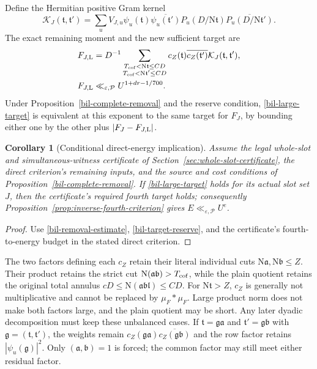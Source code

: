 \documentclass[11pt]{article}
\newtheorem{corollary}[theorem]{Corollary}
\theoremstyle{definition}
\newcommand{\N}{\mathrm N}
\newcommand{\eps}{\varepsilon}
\newcommand{\lls}{\ll_{\eps,\mathcal P}}
\begin{document}
Define the Hermitian positive Gram kernel
\begin{equation}\label{bil-large-kernel}
 \mathcal K_J(\mathfrak t,\mathfrak t')
 =\sum_uV_{J,u}\psi_u(\mathfrak t)
                    \overline{\psi_u(\mathfrak t')}
 P_u(D/\N\mathfrak t)\overline{P_u(D/\N\mathfrak t')}.
\end{equation}
The exact remaining moment and the new sufficient target are
\begin{align}
 F_{J,\rm L}&=D^{-1}
 \sum_{\substack{T_{\rm cof}<\N\mathfrak t\le CD\\T_{\rm cof}<\N\mathfrak t'\le CD}}
 c_Z(\mathfrak t)\overline{c_Z(\mathfrak t')}
                            \mathcal K_J(\mathfrak t,\mathfrak t'),
                                     \label{bil-large-form}\\
 F_{J,\rm L}&\lls U^{1+dr-1/700}.
                                     \label{bil-large-target}
\end{align}
Under Proposition~\ref{bil-complete-removal} and the reserve condition,
\eqref{bil-large-target} is equivalent at this exponent to the same
target for $F_J$, by bounding either one by the other plus
$|F_J-F_{J,\rm L}|$.

\begin{corollary}[Conditional direct-energy implication]
\label{bil-energy-corollary}
Assume the legal whole-slot and simultaneous-witness certificate of
Section~\ref{sec:whole-slot-certificate}, the direct criterion's remaining
inputs, and the source and cost conditions of
Proposition~\ref{bil-complete-removal}.  If
\eqref{bil-large-target} holds for its actual slot set $J$, then the
certificate's required fourth target holds; consequently
Proposition~\ref{prop:inverse-fourth-criterion} gives $E\lls U^e$.
\end{corollary}
\begin{proof}
Use \eqref{bil-removal-estimate}, \eqref{bil-target-reserve}, and the
certificate's fourth-to-energy budget in the stated direct criterion.
\end{proof}

The two factors defining each $c_Z$ retain their literal individual
cuts $\N\mathfrak a,\N\mathfrak b\le Z$.
Their product retains the strict cut $\N(\mathfrak a\mathfrak b)>T_{\rm cof}$,
while the plain quotient retains the original total annulus
$cD\le\N(\mathfrak a\mathfrak b\mathfrak l)\le CD$.
For $\N\mathfrak t>Z$, $c_Z$ is generally not multiplicative and
cannot be replaced by $\mu_F*\mu_F$.  Large product norm does not
make both factors large, and the plain quotient may be short.
Any later dyadic decomposition must keep these unbalanced cases.
If $\mathfrak t=\mathfrak g\mathfrak a$ and
$\mathfrak t'=\mathfrak g\mathfrak b$ with
$\mathfrak g=(\mathfrak t,\mathfrak t')$, the weights remain
$c_Z(\mathfrak g\mathfrak a)\overline{c_Z(\mathfrak g\mathfrak b)}$
and the row factor retains $|\psi_u(\mathfrak g)|^2$.
Only $(\mathfrak a,\mathfrak b)=1$ is forced; the common factor may
still meet either residual factor.
\end{document}

